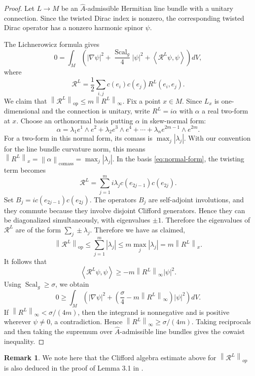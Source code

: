 \documentclass[11pt,reqno]{amsart}
\numberwithin{equation}{section}
\numberwithin{equation}{section}
\theoremstyle{definition}
\newtheorem{remark}[theorem]{Remark}
\DeclareMathOperator{\Scal}{Scal}
\DeclareMathOperator{\comass}{comass}
\newcommand{\Ah}{\widehat A}
\newcommand{\norm}[1]{\left\lVert #1\right\rVert}
\newcommand{\ip}[2]{\left\langle #1,#2\right\rangle}
\begin{document}
\begin{proof}
Let \(L\to M\) be an \(\Ah\)-admissible Hermitian line bundle with a unitary connection. Since the twisted Dirac index is nonzero, the corresponding twisted Dirac operator has a nonzero harmonic spinor \(\psi\).

The Lichnerowicz formula gives
\[
0
=
\int_M
\left(
|\nabla\psi|^2
+
\frac{\Scal_g}{4}|\psi|^2
+
\ip{\mathcal R^L\psi}{\psi}
\right)dV,
\]
where
\[
\mathcal R^L
=
\frac12
\sum_{i,j}c(e_i)c(e_j)R^L(e_i,e_j).
\]
We claim that \(\norm{\mathcal R^L}_{\operatorname{op}}\le m\norm{R^L}_\infty\). Fix a point $x\in M$. Since $L_x$ is one-dimensional and the connection is unitary, write $R^L=i\alpha$ with $\alpha$ a real two-form at $x$. Choose an orthonormal basis putting $\alpha$ in skew-normal form:
\begin{equation}\label{eq:normal-form}
\alpha
=
\lambda_1 e^1\wedge e^2
+
\lambda_2 e^3\wedge e^4
+
\cdots+
\lambda_n e^{2m-1}\wedge e^{2m}.
\end{equation}
For a two-form in this normal form, its comass is $\max_j |\lambda_j|$. With our convention for the line bundle curvature norm, this means\( \norm{R^L}_x=\norm{\alpha}_{\comass}=\max_j|\lambda_j|.\)
In the basis \eqref{eq:normal-form}, the twisting term becomes
\begin{equation*}
\mathcal R^L
=
\sum_{j=1}^m i\lambda_j c(e_{2j-1})c(e_{2j}).
\end{equation*}
Set $B_j=i c(e_{2j-1})c(e_{2j})$. The operators $B_j$ are self-adjoint involutions, and they commute because they involve disjoint Clifford generators. Hence they can be diagonalized simultaneously, with eigenvalues $\pm1$. Therefore the eigenvalues of $\mathcal R^L$ are of the form $\sum_j \pm \lambda_j$. Therefore we have as claimed,
\begin{equation}\label{eq:op-norm-bound}
\norm{\mathcal R^L}_{\operatorname{op}}
\le
\sum_{j=1}^m |\lambda_j|
\le
m\max_j|\lambda_j|
=
m\norm{R^L}_x.
\end{equation}
It follows that
\[
\ip{\mathcal R^L\psi}{\psi}
\ge
-m\norm{R^L}_\infty|\psi|^2.
\]
Using \(\Scal_g\ge\sigma\), we obtain
\[
0
\ge
\int_M
\left(
|\nabla \psi|^2
+
\left(\frac{\sigma}{4}-m\norm{R^L}_\infty\right)
|\psi|^2
\right)dV.
\]
If \(\norm{R^L}_\infty<\sigma/(4m)\), then the integrand is nonnegative and is positive wherever \(\psi\neq0\), a contradiction. Hence \(\norm{R^L}_\infty\ge\sigma/(4m)\). Taking reciprocals and then taking the supremum over \(\Ah\)-admissible line bundles gives the cowaist inequality.
\end{proof}
\begin{remark}
    We note here that the Clifford algebra estimate above for $\norm{\mathcal{R}^L}_{op}$ is also deduced in the proof of Lemma 3.1 in \cite{CHZ}.  
\end{remark}
\end{document}
